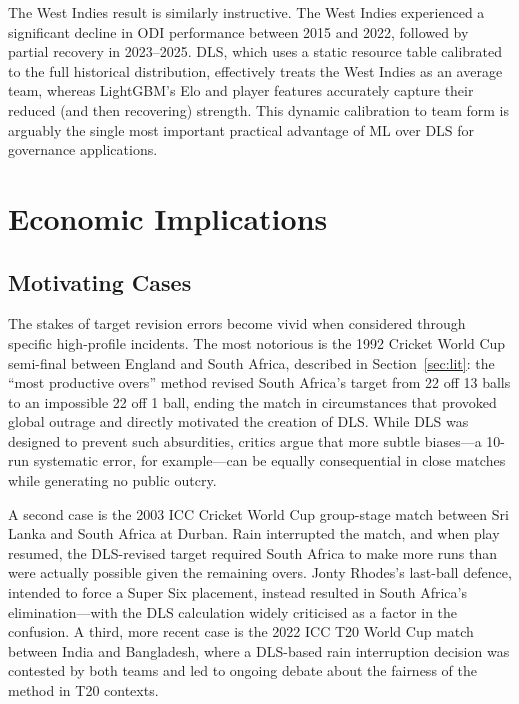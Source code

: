 \documentclass[10pt,a4paper,twocolumn]{article}
\begin{document}
The West Indies result is similarly instructive. The West Indies experienced a significant decline in ODI performance between 2015 and 2022, followed by partial recovery in 2023--2025. DLS, which uses a static resource table calibrated to the full historical distribution, effectively treats the West Indies as an average team, whereas LightGBM's Elo and player features accurately capture their reduced (and then recovering) strength. This dynamic calibration to team form is arguably the single most important practical advantage of ML over DLS for governance applications.

\section{Economic Implications}
\label{sec:econ}

\subsection{Motivating Cases}

The stakes of target revision errors become vivid when considered through specific high-profile incidents. The most notorious is the 1992 Cricket World Cup semi-final between England and South Africa, described in Section~\ref{sec:lit}: the ``most productive overs'' method revised South Africa's target from 22 off 13 balls to an impossible 22 off 1 ball, ending the match in circumstances that provoked global outrage and directly motivated the creation of DLS. While DLS was designed to prevent such absurdities, critics argue that more subtle biases---a 10-run systematic error, for example---can be equally consequential in close matches while generating no public outcry.

A second case is the 2003 ICC Cricket World Cup group-stage match between Sri Lanka and South Africa at Durban. Rain interrupted the match, and when play resumed, the DLS-revised target required South Africa to make more runs than were actually possible given the remaining overs. Jonty Rhodes's last-ball defence, intended to force a Super Six placement, instead resulted in South Africa's elimination---with the DLS calculation widely criticised as a factor in the confusion. A third, more recent case is the 2022 ICC T20 World Cup match between India and Bangladesh, where a DLS-based rain interruption decision was contested by both teams and led to ongoing debate about the fairness of the method in T20 contexts.
\end{document}
